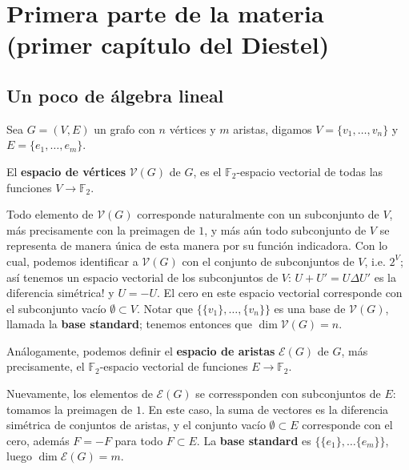 \documentclass[../main.tex]{subfiles}
\begin{document}
\appendix

\chapter{Primera parte de la materia (primer capítulo del Diestel)}

\section[]{Un poco de álgebra lineal}

Sea $G = (V,E)$ un grafo con $n$ vértices y $m$ aristas, digamos $V = \{v_1,\ldots,v_n\}$ y $E = \{e_1,\ldots,e_m\}$.

\begin{definition}
El \textbf{espacio de vértices} $\mathcal{V} (G)$ de $G$, es el $\mathbb{F}_2$-espacio vectorial de todas las funciones $V \rightarrow \mathbb{F}_2$.
\end{definition}
Todo elemento de $\mathcal{V} (G)$ corresponde naturalmente con un subconjunto de $V$, más precisamente con la preimagen de $1$, y más aún todo subconjunto de $V$ se representa de manera única de esta manera por su función indicadora. Con lo cual, podemos identificar a $\mathcal{V} (G)$ con el conjunto de subconjuntos de $V$, i.e. $2^V$; así tenemos un espacio vectorial de los subconjuntos de $V$: $U + U' = U \Delta U'$ es la diferencia simétrica! y $U = -U$. El cero en este espacio vectorial corresponde con el subconjunto vacío $\emptyset \subset V$. Notar que $\{ \{ v_1 \}, \ldots, \{ v_n\} \}$ es una base de $\mathcal{V} (G)$, llamada la \textbf{base standard}; tenemos entonces que $\dim \mathcal{V} (G) = n$.


\begin{definition}
Análogamente, podemos definir el \textbf{espacio de aristas} $\mathcal{E} (G)$ de $G$, más precisamente, el $\mathbb{F}_2$-espacio vectorial de funciones $E \rightarrow \mathbb{F}_2$.
\end{definition}
Nuevamente, los elementos de $\mathcal{E} (G)$ se corressponden con subconjuntos de $E$: tomamos la preimagen de $1$. En este caso, la suma de vectores es la diferencia simétrica de conjuntos de aristas, y el conjunto vacío $\emptyset \subset E$ corresponde con el cero, además $F = -F$ para todo $F \subset E$. La \textbf{base standard} es $\{ \{e_1\},\ldots \{e_m\} \}$, luego $\dim \mathcal{E} (G) = m$.
\end{document}
